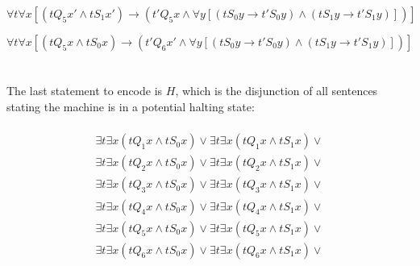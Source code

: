 \documentclass[a4paper,11pt]{article}
\begin{document}
\begin{equation}
\forall t \forall x [(tQ_{5}x' \land tS_{1}x') \rightarrow (t'Q_{5}x \land \forall y [(tS_{0}y \rightarrow t'S_{0}y)
\land (tS_{1}y \rightarrow t'S_{1}y)])]
\end{equation}

\begin{equation}
\forall t \forall x [(tQ_{5}x \land tS_{0}x) \rightarrow (t'Q_{6}x' \land \forall y [(tS_{0}y \rightarrow t'S_{0}y) 
\land (tS_{1}y \rightarrow t'S_{1}y)])]
\end{equation}
\\\\
The last statement to encode is $H$, which is the disjunction of all sentences stating the machine is in a 
potential halting state:

\begin{multline}
\\ \exists t \exists x (tQ_{1}x \land tS_{0}x) \lor \exists t \exists x (tQ_{1}x \land tS_{1}x) \lor \\
\exists t \exists x (tQ_{2}x \land tS_{0}x) \lor \exists t \exists x (tQ_{2}x \land tS_{1}x) \lor \\
\exists t \exists x (tQ_{3}x \land tS_{0}x) \lor \exists t \exists x (tQ_{3}x \land tS_{1}x) \lor \\
\exists t \exists x (tQ_{4}x \land tS_{0}x) \lor \exists t \exists x (tQ_{4}x \land tS_{1}x) \lor \\
\exists t \exists x (tQ_{5}x \land tS_{0}x) \lor \exists t \exists x (tQ_{5}x \land tS_{1}x) \lor \\
\exists t \exists x (tQ_{6}x \land tS_{0}x) \lor \exists t \exists x (tQ_{6}x \land tS_{1}x) \lor \\
\end{multline}
\end{document}
